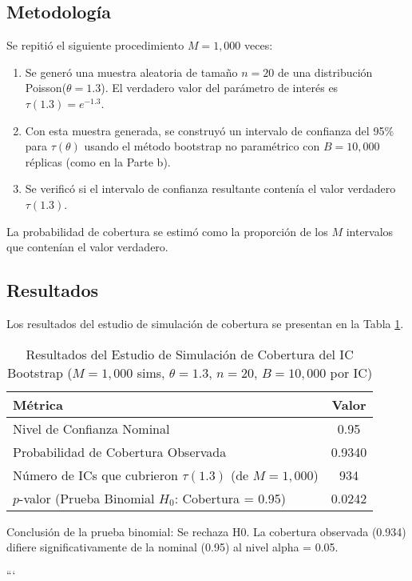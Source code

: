 \documentclass[
  11pt,
  a4paper]{article}
\begin{document}
\subsection{Metodología}

Se repitió el siguiente procedimiento \(M=1,000\) veces:

\begin{enumerate}
    \item Se generó una muestra aleatoria de tamaño $n=20$ de una distribución Poisson($\theta=1.3$). El verdadero valor del parámetro de interés es $\tau(1.3) = e^{-1.3}$.
    \item Con esta muestra generada, se construyó un intervalo de confianza del 95\% para $\tau(\theta)$ usando el método bootstrap no paramétrico con $B=10,000$ réplicas (como en la Parte b).
    \item Se verificó si el intervalo de confianza resultante contenía el valor verdadero $\tau(1.3)$.
\end{enumerate}

La probabilidad de cobertura se estimó como la proporción de los \(M\)
intervalos que contenían el valor verdadero.

\subsection{Resultados}

Los resultados del estudio de simulación de cobertura se presentan en la
Tabla \ref{tab:coverage_results_c}.

\begin{table}[H]
    \centering
    \caption{Resultados del Estudio de Simulación de Cobertura del IC Bootstrap ($M=1,000$ sims, $\theta=1.3$, $n=20$, $B=10,000$ por IC)}
    \label{tab:coverage_results_c}
    \begin{tabular}{lc}
        \toprule
        Métrica & Valor \\
        \midrule
        Nivel de Confianza Nominal & 0.95 \\
        Probabilidad de Cobertura Observada & 0.9340 \\
        Número de ICs que cubrieron $\tau(1.3)$ (de $M=1,000$) & 934 \\
        $p$-valor (Prueba Binomial $H_0$: Cobertura = 0.95) & 0.0242 \\
        \bottomrule
    \end{tabular}
\end{table}

Conclusión de la prueba binomial: Se rechaza H0. La cobertura observada
(0.934) difiere significativamente de la nominal (0.95) al nivel alpha =
0.05.

\vspace{2em}
\hrulefill

```
\end{document}
